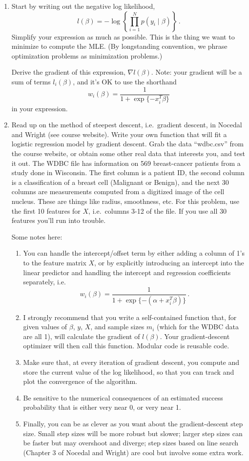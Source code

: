 \documentclass{article}
\begin{document}
\begin{enumerate}
\item Start by writing out the negative log likelihood,
$$
l(\beta) = - \log \left \{ \prod_{i=1}^N p(y_i \mid \beta) \right \} \, .
$$
Simplify your expression as much as possible. This is the thing we want to minimize to compute the MLE.  (By longstanding convention, we phrase optimization problems as minimization problems.)

Derive the gradient of this expression, $\nabla l(\beta)$.   Note: your gradient will be a sum of terms $l_i(\beta)$, and it's OK to use the shorthand
$$
w_i(\beta) =  \frac{1}{1 + \exp\{-x_i^T \beta\}}
$$
in your expression.


\item Read up on the method of steepest descent, i.e.~gradient descent, in Nocedal and Wright (see course website).  Write your own function that will fit a logistic regression model by gradient descent.  Grab the data ``wdbc.csv'' from the course website, or obtain some other real data that interests you, and test it out.  The WDBC file has information on 569 breast-cancer patients from a study done in Wisconsin.  The first column is a patient ID, the second column is a classification of a breast cell (Malignant or Benign), and the next 30 columns are measurements computed from a digitized image of the cell nucleus.  These are things like radius, smoothness, etc.  For this problem, use the first 10 features for $X$, i.e.~columns 3-12 of the file.  If you use all 30 features you'll run into trouble.

Some notes here:
\begin{enumerate}
\item You can handle the intercept/offset term by either adding a column of 1's to the feature matrix $X$, or by explicitly introducing an intercept into the linear predictor and handling the intercept and regression coefficients separately, i.e.
$$
w_i(\beta) =  \frac{1}{1 + \exp\{-(\alpha + x_i^T \beta )\}} \, .
$$
\item I strongly recommend that you write a self-contained function that, for given values of $\beta$, $y$, $X$, and sample sizes $m_i$ (which for the WDBC data are all 1), will calculate the gradient of $l(\beta)$.  Your gradient-descent optimizer will then call this function.  Modular code is reusable code.
\item Make sure that, at every iteration of gradient descent, you compute and store the current value of the log likelihood, so that you can track and plot the convergence of the algorithm.
\item Be sensitive to the numerical consequences of an estimated success probability that is either very near 0, or very near 1.
\item Finally, you can be as clever as you want about the gradient-descent step size.  Small step sizes will be more robust but slower; larger step sizes can be faster but may overshoot and diverge; step sizes based on line search (Chapter 3 of Nocedal and Wright) are cool but involve some extra work.
\end{enumerate}



\end{enumerate}
\end{document}
